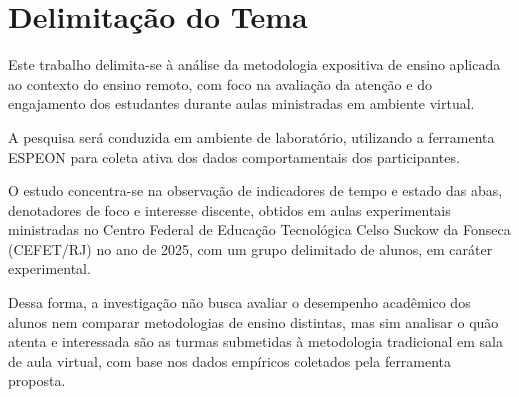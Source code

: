 \section{Delimitação do Tema}\label{sec:delimitacao}
Este trabalho delimita-se à análise da metodologia expositiva de ensino aplicada ao contexto do ensino remoto, com foco na avaliação da atenção e do engajamento dos estudantes durante aulas ministradas em ambiente virtual.

A pesquisa será conduzida em ambiente de laboratório, utilizando a ferramenta ESPEON para coleta ativa dos dados comportamentais dos participantes.

O estudo concentra-se na observação de indicadores de tempo e estado das abas, denotadores de foco e interesse discente, obtidos em aulas experimentais ministradas no Centro Federal de Educação Tecnológica Celso Suckow da Fonseca (CEFET/RJ) no ano de 2025, com um grupo delimitado de alunos, em caráter experimental.

Dessa forma, a investigação não busca avaliar o desempenho acadêmico dos alunos nem comparar metodologias de ensino distintas, mas sim analisar o quão atenta e interessada são as turmas submetidas à metodologia tradicional em sala de aula virtual, com base nos dados empíricos coletados pela ferramenta proposta.